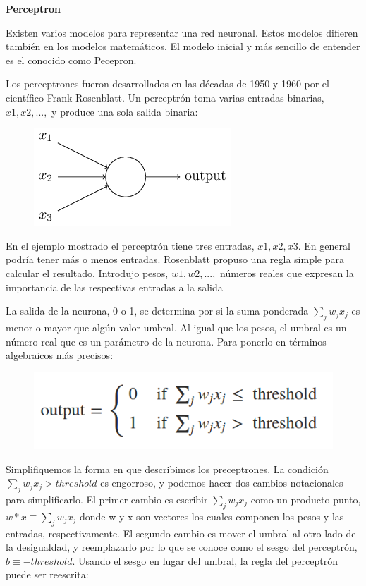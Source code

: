 \textbf{Perceptron}

Existen varios modelos para representar una red neuronal. Estos modelos difieren también en los modelos matemáticos. El modelo inicial y más sencillo de entender es el conocido como Pecepron.

Los perceptrones fueron desarrollados en las décadas de 1950 y 1960 por el científico Frank Rosenblatt.  Un perceptrón toma varias entradas binarias, $x1,x2,...,$ y produce una sola salida binaria: 

\begin{figure}[ht]
	\centering
	\includegraphics[width=0.30\linewidth]{figuras/perceptron.png}
	\label{qvalue}
\end{figure}

En el ejemplo mostrado el perceptrón tiene tres entradas, $x1,x2,x3.$ En general podría tener más o menos entradas. Rosenblatt propuso una regla simple para calcular el resultado. Introdujo pesos, $w1,w2,...,$ números reales que expresan la importancia de las respectivas entradas a la salida

  La salida de la neurona, 0 o 1, se determina por si la suma ponderada $\sum_{j} w_{j} x_{j} $ es menor o mayor que algún valor umbral. Al igual que los pesos, el umbral es un número real que es un parámetro de la neurona. Para ponerlo en términos algebraicos más precisos: 
  
  \begin{figure}[ht]
	\centering
	\includegraphics[width=0.30\linewidth]{figuras/perceptron_formula.png}
	\label{qvalue}
\end{figure}
  
 Simplifiquemos la forma en que describimos los preceptrones. La condición $\sum_{j} w_{j} x_{j} > threshold$  es engorroso, y podemos hacer dos cambios notacionales para simplificarlo. El primer cambio es escribir $\sum_{j} w_{j} x_{j} $ como un producto punto, $ w * x \equiv \sum_{j} w_{j} x_{j} $ donde w y x son vectores los cuales componen los pesos y las entradas, respectivamente. El segundo cambio es mover el umbral al otro lado de la desigualdad, y reemplazarlo por lo que se conoce como el sesgo del perceptrón, $ b \equiv -threshold $. Usando el sesgo en lugar del umbral, la regla del perceptrón puede ser reescrita: 
 
